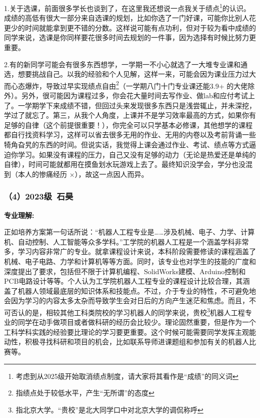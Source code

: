 1.关于选课，前面很多学长也谈到了，在这里我还想说一点我关于绩点\footnote{考虑到从2025级开始取消绩点制度，请大家将其看作是“成绩”的同义词}的认识。成绩的高低有很大一部分来自选课的规划，比如你选了一门好课，可能你比别人花更少的时间就能拿到更不错的分数。这样说可能有点功利，但对于较为看中成绩的同学来说，选课是你同样要花很多时间去规划的一件事，因为选择有时候比努力更重要。

\vspace{10pt}

2.有的新同学可能会有很多东西想学，一学期一不小心就选了一大堆专业课和通选，想要挑战自己。以我的经验和个人见解，这样一来，可能会因为课业压力过大而心态爆炸，导致过早实现绩点自由\footnote{指绩点处于较低水平，产生“无所谓”的态度}（一学期八门十门专业课还能3.9+ 的大佬除外）。另外，很可能因为课程过多，你会花大量时间去写作业、做lab和应付考试上了。一学期学下来成绩不错，但回过头来发现很多东西只是浅尝辄止，并未深挖，学过了就忘了。第三，从我个人角度，上课并不是学习效率最高的方式，如果你有足够的自律（这个前提很重要！），你完全可以只学基本必修课，其他想学的课程都自行找资料学习，这样可以省去很多无用的作业、无用的内卷以及考前背诵一些犄角旮旯的东西的时间。但说实话，我觉得上课会通过作业、考试、绩点等方式逼迫你学习。如果没有课程的压力，自己又没有足够的动力（无论是热爱还是单纯的自律），时间可能就都用在摸鱼划水玩游戏上去了。最终知识没学会，学分也没混到（本人的惨痛经历 ×），故这一点因人而异。

\subsubsection{（4）2023级\ 石昊}

\textbf{专业理解:}

正如培养方案第一句话所说：“机器人工程专业是……涉及机械、电子、力学、计算机、自动控制、人工智能等众多学科。”工学院的机器人工程是一个涵盖学科非常多，学习内容非常广的专业。就拿课程设计来说，本科阶段需要修读的课程涵盖了机械、电子电路、力学和计算机等等方面。同时，该专业也对学生的技能的广度和深度提出了要求，包括但不限于计算机编程、SolidWorks建模、Arduino控制和PCB电路设计等等。个人认为工学院机器人工程专业的课程设计比较合理，其涵盖了机器人领域最底层的知识体系和技能点。不过，介于专业的特性，不可避免地会因为学习的内容太多太杂而导致学生会对日后的方向产生迷茫和焦虑。而且，不可否认的是，相较其他工科类院校的学习机器人的同学来说，贵校\footnote{指北京大学。“贵校”是北大同学口中对北京大学的调侃称呼}机器人工程专业的同学在动手做项目或者做科研的经历会比较少。理论固然重要，但是作为一个工科学科实践的经验要比理论的学习要更重要。这个时候可能需要同学发挥主观能动性，积极寻找科研和项目的机会，比如联系导师进课题组和参加有关的机器人比赛等。

